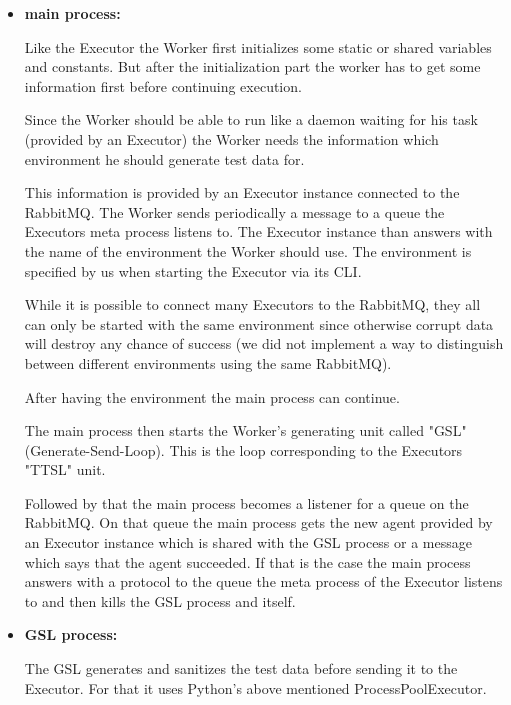 \begin{itemize}[label={}]

  \item \textbf{main process:}

        Like the Executor the Worker first initializes
        some static or shared variables and constants.
        But after the initialization part the worker has
        to get some information first before continuing
        execution.

        Since the Worker should be able to run like a
        daemon waiting for his task (provided by an
        Executor) the Worker needs the information which
        environment he should generate test data for.

        This information is provided by an Executor
        instance connected to the RabbitMQ. The Worker
        sends periodically a message to a queue the
        Executors meta process listens to. The Executor
        instance than answers with the name of the
        environment the Worker should use. The environment
        is specified by us when starting the Executor via
        its CLI.

        While it is possible to connect many Executors to
        the RabbitMQ, they all can only be started with
        the same environment since otherwise corrupt data
        will destroy any chance of success (we did not
        implement a way to distinguish between different
        environments using the same RabbitMQ).

        After having the environment the main process can
        continue.

        The main process then starts the Worker's
        generating unit called "GSL" (Generate-Send-Loop).
        This is the loop corresponding to the Executors
        "TTSL" unit.

        Followed by that the main process becomes a
        listener for a queue on the RabbitMQ. On that queue
        the main process gets the new agent provided by an
        Executor instance which is shared with the GSL
        process or a message which says that the agent
        succeeded. If that is the case the main process
        answers with a protocol to the queue the meta
        process of the Executor listens to and then kills
        the GSL process and itself.

  \item \textbf{GSL process:}

        The GSL generates and sanitizes the test data
        before sending it to the Executor. For that it uses
        Python's above mentioned ProcessPoolExecutor.


\end{itemize}
